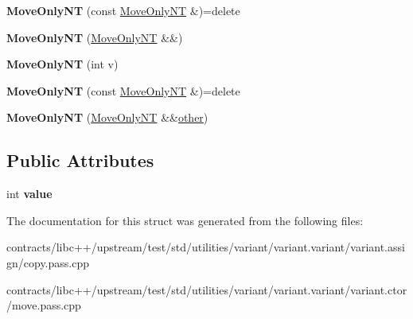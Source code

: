 \begin{DoxyCompactItemize}
\item 
\mbox{\label{struct_move_only_n_t_a0d882fffac1b41efd8d011671b826ab7}} 
{\bfseries Move\+Only\+NT} (const \mbox{\hyperlink{struct_move_only_n_t}{Move\+Only\+NT}} \&)=delete
\item 
\mbox{\label{struct_move_only_n_t_a7d213f30337754780884a62e86896e3b}} 
{\bfseries Move\+Only\+NT} (\mbox{\hyperlink{struct_move_only_n_t}{Move\+Only\+NT}} \&\&)
\item 
\mbox{\label{struct_move_only_n_t_a7e1c410cf8acb4e460ac3bce694566dd}} 
{\bfseries Move\+Only\+NT} (int v)
\item 
\mbox{\label{struct_move_only_n_t_a0d882fffac1b41efd8d011671b826ab7}} 
{\bfseries Move\+Only\+NT} (const \mbox{\hyperlink{struct_move_only_n_t}{Move\+Only\+NT}} \&)=delete
\item 
\mbox{\label{struct_move_only_n_t_ad281ef98762f8ad73b746e0a77473911}} 
{\bfseries Move\+Only\+NT} (\mbox{\hyperlink{struct_move_only_n_t}{Move\+Only\+NT}} \&\&\mbox{\hyperlink{structother}{other}})
\end{DoxyCompactItemize}
\subsection*{Public Attributes}
\begin{DoxyCompactItemize}
\item 
\mbox{\label{struct_move_only_n_t_a9446ceda83c06a9b9b6f88bf5e27bd6e}} 
int {\bfseries value}
\end{DoxyCompactItemize}


The documentation for this struct was generated from the following files\+:\begin{DoxyCompactItemize}
\item 
contracts/libc++/upstream/test/std/utilities/variant/variant.\+variant/variant.\+assign/copy.\+pass.\+cpp\item 
contracts/libc++/upstream/test/std/utilities/variant/variant.\+variant/variant.\+ctor/move.\+pass.\+cpp\end{DoxyCompactItemize}
